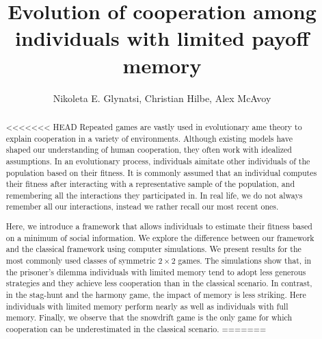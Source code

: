 \documentclass[11pt]{article}
\title{\bf  \sffamily \LARGE Evolution of cooperation among individuals with
limited payoff memory\\}
\date{}
\author{Nikoleta E. Glynatsi, Christian Hilbe, Alex McAvoy}
\theoremstyle{plainCl1}
\theoremstyle{plainCl2}
\begin{document}
\maketitle

\begin{abstract}
<<<<<<< HEAD
Repeated games are vastly used in evolutionary ame theory to explain cooperation in a variety of environments. Although existing models have shaped our understanding of human cooperation, they often work with idealized
assumptions. In an evolutionary process, individuals aimitate other individuals
of the population based on their fitness. It is commonly assumed that an
individual computes their fitness after interacting with a representative sample
of the population, and remembering all the interactions they participated in. In
real life, we do not always remember all our interactions, instead we rather
recall our most recent ones.

Here, we introduce a framework that allows individuals to estimate their fitness
based on a minimum of social information. We explore the difference between our
framework and the classical framework using computer simulations. We present results for
the most commonly used classes of symmetric \(2 \times 2\) games. The
simulations show that, in the prisoner's dilemma individuals with limited memory
tend to adopt less generous strategies and they achieve less cooperation than in
the classical scenario. In contrast, in the stag-hunt and the harmony game, the
impact of memory is less striking. Here individuals with limited memory perform
nearly as well as individuals with full memory. Finally, we observe that the
snowdrift game is the only game for which cooperation can be underestimated in
the classical scenario.
=======


\end{abstract}
\end{document}
